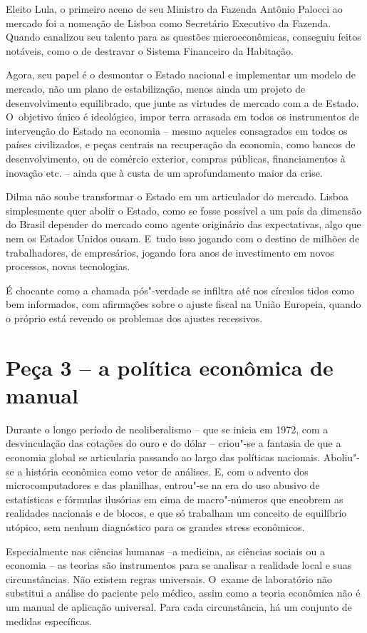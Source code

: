 Eleito Lula, o primeiro aceno de seu Ministro da Fazenda Antônio Palocci
ao mercado foi a nomeação de Lisboa como Secretário Executivo da
Fazenda. Quando canalizou seu talento para as questões microeconômicas,
conseguiu feitos notáveis, como o de destravar o Sistema Financeiro da
Habitação.

Agora, seu papel é o desmontar o Estado nacional e implementar um modelo
de mercado, não um plano de estabilização, menos ainda um projeto de
desenvolvimento equilibrado, que junte as virtudes de mercado com a de
Estado. O~objetivo único é ideológico, impor terra arrasada em todos os
instrumentos de intervenção do Estado na economia -- mesmo aqueles
consagrados em todos os países civilizados, e peças centrais na
recuperação da economia, como bancos de desenvolvimento, ou de comércio
exterior, compras públicas, financiamentos à inovação etc. -- ainda que
à custa de um aprofundamento maior da crise.

Dilma não soube transformar o Estado em um articulador do mercado.
Lisboa simplesmente quer abolir o Estado, como se fosse possível a um
país da dimensão do Brasil depender do mercado como agente originário
das expectativas, algo que nem os Estados Unidos ousam. E~tudo isso
jogando com o destino de milhões de trabalhadores, de empresários,
jogando fora anos de investimento em novos processos, novas tecnologias.

É chocante como a chamada pós"-verdade se infiltra até nos círculos tidos
como bem informados, com afirmações sobre o ajuste fiscal na União
Europeia, quando o próprio  está revendo os problemas dos ajustes
recessivos.

\section{Peça 3 -- a política econômica de manual}

Durante o longo período de neoliberalismo -- que se inicia em 1972, com
a desvinculação das cotações do ouro e do dólar -- criou"-se a fantasia
de que a economia global se articularia passando ao largo das políticas
nacionais. Aboliu"-se a história econômica como vetor de análises. E, com
o advento dos microcomputadores e das planilhas, entrou"-se na era do uso
abusivo de estatísticas e fórmulas ilusórias em cima de macro"-números
que encobrem as realidades nacionais e de blocos, e que só trabalham um
conceito de equilíbrio utópico, sem nenhum diagnóstico para os grandes
stress econômicos.

Especialmente nas ciências humanas --a medicina, as ciências sociais ou
a economia -- as teorias são instrumentos para se analisar a realidade
local e suas circunstâncias. Não existem regras universais. O~exame de
laboratório não substitui a análise do paciente pelo médico, assim como
a teoria econômica não é um manual de aplicação universal. Para cada
circunstância, há um conjunto de medidas específicas.

